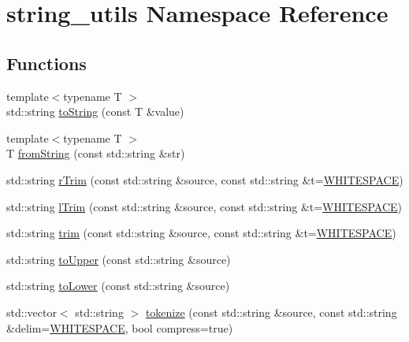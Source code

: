 \hypertarget{namespacestring__utils}{\section{string\-\_\-utils \-Namespace \-Reference}
\label{namespacestring__utils}
}
\subsection*{\-Functions}
\begin{DoxyCompactItemize}
\item 
{\footnotesize template$<$typename T $>$ }\\std\-::string \hyperlink{namespacestring__utils_a7d3311ef9559a1b5e6fdef079b28cb47}{to\-String} (const \-T \&value)
\item 
{\footnotesize template$<$typename T $>$ }\\\-T \hyperlink{namespacestring__utils_a7058154de83b4b508107b4ef172f2b8f}{from\-String} (const std\-::string \&str)
\item 
std\-::string \hyperlink{namespacestring__utils_a7361b7aeffdaecd0ee490f6f12796339}{r\-Trim} (const std\-::string \&source, const std\-::string \&t=\hyperlink{namespacestring__utils_a716c3d0cc1ab19bd56d1b2aa2a50662f}{\-W\-H\-I\-T\-E\-S\-P\-A\-C\-E})
\item 
std\-::string \hyperlink{namespacestring__utils_a7e604334a4cdd40e0837691c6ce5164e}{l\-Trim} (const std\-::string \&source, const std\-::string \&t=\hyperlink{namespacestring__utils_a716c3d0cc1ab19bd56d1b2aa2a50662f}{\-W\-H\-I\-T\-E\-S\-P\-A\-C\-E})
\item 
std\-::string \hyperlink{namespacestring__utils_a63713e559707c9cc927d62729fe424c9}{trim} (const std\-::string \&source, const std\-::string \&t=\hyperlink{namespacestring__utils_a716c3d0cc1ab19bd56d1b2aa2a50662f}{\-W\-H\-I\-T\-E\-S\-P\-A\-C\-E})
\item 
std\-::string \hyperlink{namespacestring__utils_a4a692eb62e01ecc0757df7d2f53d3f36}{to\-Upper} (const std\-::string \&source)
\item 
std\-::string \hyperlink{namespacestring__utils_a213604a8351148a005bb3bea470358e1}{to\-Lower} (const std\-::string \&source)
\item 
std\-::vector$<$ std\-::string $>$ \hyperlink{namespacestring__utils_a535b9b20922e895321420967d2030116}{tokenize} (const std\-::string \&source, const std\-::string \&delim=\hyperlink{namespacestring__utils_a716c3d0cc1ab19bd56d1b2aa2a50662f}{\-W\-H\-I\-T\-E\-S\-P\-A\-C\-E}, bool compress=true)

\end{DoxyCompactItemize}
